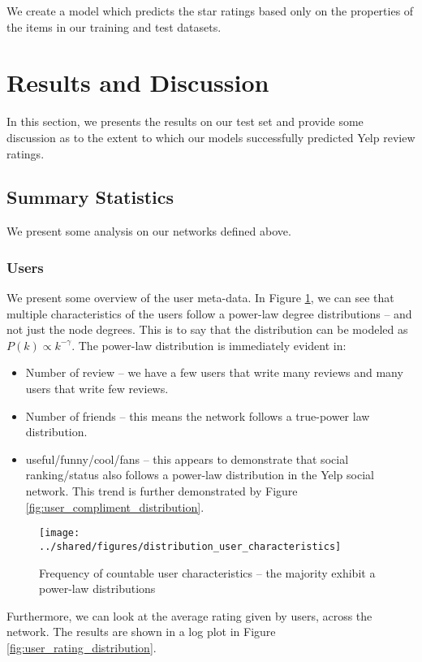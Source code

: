 \documentclass[letterpaper, 10 pt, conference]{ieeeconf}  %
\begin{document}
We create a model which predicts the star ratings based only on the properties of the items in our training and test datasets. 

\section{Results and Discussion}
In this section, we presents the results on our test set and provide some discussion as to the extent to which our models successfully predicted Yelp review ratings.

\subsection{Summary Statistics}
We present some analysis on our networks defined above. 

\subsubsection{Users}
We present some overview of the user meta-data. In Figure \ref{fig:user_characteristics}, we can see that multiple characteristics of the users follow a power-law degree distributions -- and not just the node degrees. This is to say that the distribution can be modeled as $P(k) \propto k^{-\gamma}$. The power-law distribution is immediately evident in:

\begin{itemize}
\item Number of review -- we have a few users that write many reviews and many users that write few reviews.
\item Number of friends -- this means the network follows a true-power law distribution.
\item useful/funny/cool/fans -- this appears to demonstrate that social ranking/status also follows a power-law distribution in the Yelp social network. This trend is further demonstrated by Figure \ref{fig:user_compliment_distribution}.
\end{itemize} 

\begin{figure}[h!]
\centering
\texttt{[image: ../shared/figures/distribution\_user\_characteristics]}
\caption{Frequency of countable user characteristics -- the majority exhibit a power-law distributions}
\label{fig:user_characteristics}
\end{figure}

Furthermore, we can look at the average rating given by users, across the network. The results are shown in a log plot in Figure \ref{fig:user_rating_distribution}.
\end{document}
